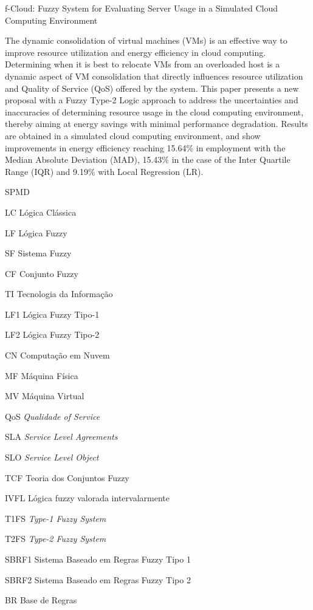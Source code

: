 \documentclass[tcc,capa]{texufpel}
\begin{document}
\begin{englishabstract}%
  {f-Cloud: Fuzzy System for Evaluating Server Usage in a Simulated Cloud Computing Environment}
  
  The dynamic consolidation of virtual machines (VMs) is an effective way to improve resource utilization and energy efficiency in cloud computing. Determining when it is best to relocate VMs from an overloaded host is a dynamic aspect of VM consolidation that directly influences resource utilization and Quality of Service (QoS) offered by the system. This paper presents a new proposal with a Fuzzy Type-2 Logic approach to address the uncertainties and inaccuracies of determining resource usage in the cloud computing environment, thereby aiming at energy savings with minimal performance degradation. Results are obtained in a simulated cloud computing environment, and show improvements in energy efficiency reaching 15.64\% in employment with the Median Absolute Deviation (MAD), 15.43\% in the case of the Inter Quartile Range (IQR) and 9.19\% with Local Regression (LR).
  
\end{englishabstract}

\listoffigures

\listoftables

\begin{listofabbrv}{SPMD}
        \item[LC] Lógica Clássica
        \item[LF] Lógica Fuzzy
        \item[SF] Sistema Fuzzy
        \item[CF] Conjunto Fuzzy
        \item[TI] Tecnologia da Informação
        \item [LF1] Lógica Fuzzy Tipo-1
        \item [LF2] Lógica Fuzzy Tipo-2
        \item[CN] Computação em Nuvem
        \item[MF] Máquina Física
        \item[MV] Máquina Virtual
        \item[QoS] \textit{Qualidade of Service}
        \item[SLA] \textit{Service Level Agreements}
        \item[SLO] \textit{Service Level Object}
        \item[TCF] Teoria dos Conjuntos Fuzzy
        \item[IVFL] Lógica fuzzy valorada intervalarmente
        \item[T1FS] \textit{Type-1 Fuzzy System}
        \item[T2FS] \textit{Type-2 Fuzzy System}
        \item[SBRF1] Sistema Baseado em Regras Fuzzy Tipo 1
        \item[SBRF2] Sistema Baseado em Regras Fuzzy Tipo 2
        \item [BR] Base de Regras
\end{listofabbrv}
\end{document}

